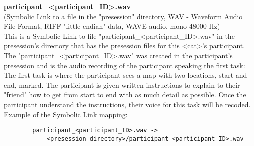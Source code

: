 \begin{description}
\begin{addmargin}[0em]{0em}
    \begin{addmargin}[1em]{0em} %
        \textbf{participant\_<participant\_ID>.wav}\\
        (Symbolic Link to a file in the "presession" directory,
        WAV - Waveform Audio File Format, RIFF "little-endian" data, WAVE audio, mono 48000 Hz)\\
        This is a Symbolic Link to file "participant\_<participant\_ID>.wav" in the presession's directory
        that has the presession files for this <cat>'s participant.\\
        The "participant\_<participant\_ID>.wav" was created in the participant's presession and is the audio recording
        of the participant speaking the first task:\\
        The first task is where the participant sees a map with two locations, start and end, marked.
        The participant is given written instructions to explain to their "friend" how to get from start to end
        with as much detail as possible. Once the participant understand the instructions, their voice for this task will be recoded.\\ 
        Example of the Symbolic Link mapping:
        \begin{verbatim}
        participant_<participant_ID>.wav ->
            <presession directory>/participant_<participant_ID>.wav
            \end{verbatim}  
        \end{addmargin} %


\end{addmargin}
\end{description}
